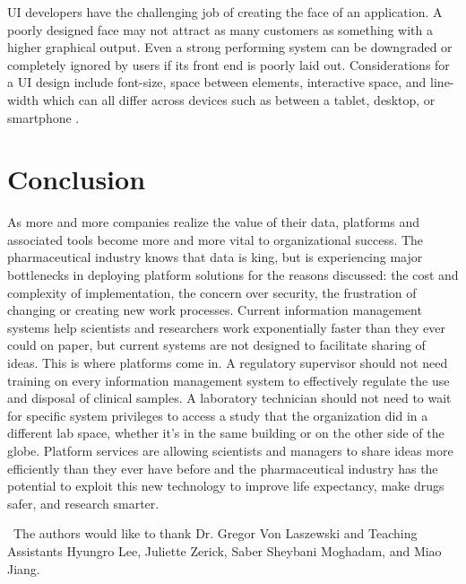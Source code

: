 \documentclass[sigconf]{acmart}
\begin{document}
UI developers have the challenging job of creating the face of an application. A poorly designed face may not attract as many customers as something with a higher graphical output. Even a strong performing system can be downgraded or completely ignored by users if its front end is poorly laid out. Considerations for a UI design include font-size, space between elements, interactive space, and line-width which can all differ across devices such as between a tablet, desktop, or smartphone \cite{Macik}. 

\section{Conclusion}
As more and more companies realize the value of their data, platforms and associated tools become more and more vital to organizational success. The pharmaceutical industry knows that data is king, but is experiencing major bottlenecks in deploying platform solutions for the reasons discussed: the cost and complexity of implementation, the concern over security, the frustration of changing or creating new work processes. Current information management systems help scientists and researchers work exponentially faster than they ever could on paper, but current systems are not designed to facilitate sharing of ideas. This is where platforms come in. A regulatory supervisor should not need training on every information management system to effectively regulate the use and disposal of clinical samples. A laboratory technician should not need to wait for specific system privileges to access a study that the organization did in a different lab space, whether it's in the same building or on the other side of the globe. Platform services are allowing scientists and managers to share ideas more efficiently than they ever have before and the pharmaceutical industry has the potential to exploit this new technology to improve life expectancy, make drugs safer, and research smarter. 

\begin{acks}

  The authors would like to thank Dr. Gregor Von Laszewski  and Teaching Assistants Hyungro Lee, Juliette Zerick, Saber Sheybani Moghadam, and Miao Jiang.

\end{acks}


 
\end{document}
